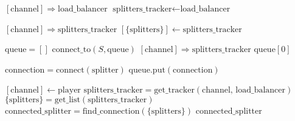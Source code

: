 \documentclass{article}
\begin{document}
\pagestyle{empty}

\newcommand{\send}{\Rightarrow}
\newcommand{\sendto}{\rightarrow}
\algrenewcommand{}
\algrenewcommand\textproc{\textrm}

\begin{algorithmic}

  \State $[\text{channel}] \send \text{load\_balancer}$
  \State \Return $\text{splitters\_tracker} \gets \text{load\_balancer}$
  \EndFunction
  
  \State $[\text{channel}] \send \text{splitters\_tracker}$
  \State \Return $[\{\mathrm{splitters}\}] \gets \mathrm{splitters\_tracker}$
  \EndFunction

  \State $\mathrm{queue}=[]$
  \State $\text{connect\_to}(S, \text{queue})$
  \EndFor 
  \State $[\text{channel}] \send \text{splitters\_tracker}$
  \State \Return $\mathrm{queue}[0]$
  \EndFunction

  \algrenewcommand{}

  \State $\text{connection} = \mathrm{connect}(\text{splitter})$
  \State $\text{queue}.\text{put}(\text{connection})$
  \EndIf
  \EndFunction

  \algrenewcommand{}
  
  \State $[\text{channel}] \gets \text{player}$
  \State $\text{splitters\_tracker} = \text{get\_tracker}(\text{channel, load\_balancer})$
  \State $\{\text{splitters}\} = \text{get\_list}(\text{splitters\_tracker})$
  \State $\text{connected\_splitter} = \text{find\_connection}(\{\text{splitters}\})$
  \State \Return $\text{connected\_splitter}$
  \EndFunction
  \EndProcedure

\end{algorithmic}
\end{document}
